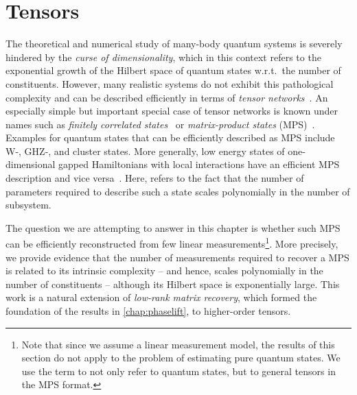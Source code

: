 
\chapter{Tensors}%
\label{chap:tensors}



The theoretical and numerical study of many-body quantum systems is severely hindered by the \emph{curse of dimensionality}, which in this context refers to the exponential growth of the Hilbert space of quantum states w.r.t.\ the number of constituents.
However, many realistic systems do not exhibit this pathological complexity and can be described efficiently in terms of \emph{tensor networks}~\cite{}.
An especially simple but important special case of tensor networks is known under names such as \emph{finitely correlated states}~\cite{Fannes_1992_Finitely} or \emph{matrix-product states} (MPS)~\cite{Garcia_2006_Matrix,Verstraete_2008_Matrix,Orus_2014_Practical}.
Examples for quantum states that can be efficiently described as MPS include W-, GHZ-, and cluster states.
More generally, low energy states of one-dimensional gapped Hamiltonians with local interactions have an efficient MPS description and vice versa~\cite{}.
Here,  refers to the fact that the number of parameters required to describe such a state scales polynomially in the number of subsystem.

The question we are attempting to answer in this chapter is whether such MPS can be efficiently reconstructed from few linear measurements\footnote{%
  Note that since we assume a linear measurement model, the results of this section do not apply to the problem of estimating pure quantum states.
  We use the term  to not only refer to quantum states, but to general tensors in the MPS format.
}.
More precisely, we provide evidence that the number of measurements required to recover a MPS is related to its intrinsic complexity -- and hence, scales polynomially in the number of constituents -- although its Hilbert space is exponentially large.
This work is a natural extension of \emph{low-rank matrix recovery}, which formed the foundation of the results in \cref{chap:phaselift}, to higher-order tensors.\\

